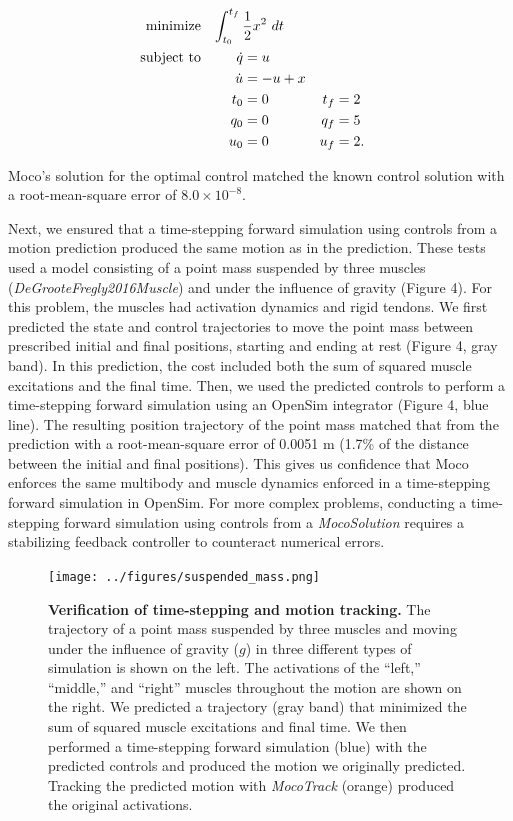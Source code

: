 \documentclass[10pt,letterpaper]{article}
\newcommand{\analytic}{
\begin{equation}
    \begin{aligned}
        \mbox{minimize} \quad
         \mathrlap{\int_{t_0}^{t_f} \frac{1}{2}x^2~dt}  \\
         \mbox{subject to} \quad
         && \dot{q} &= u \\
         && \dot{u} &= -u + x \\
         && t_0 &= 0 & t_f &= 2 \\
         && q_0 &= 0 & q_f &= 5 \\
         && u_0 &= 0 & u_f &= 2.
    \end{aligned}
\end{equation}
}
\begin{document}
\analytic

Moco's solution for the optimal control matched the known control solution with a root-mean-square error of $8.0 \times 10^{-8}$.

Next, we ensured that a time-stepping forward simulation using controls from a motion prediction produced the same motion as in the prediction. These tests used a model consisting of a point mass suspended by three muscles (\textit{DeGrooteFregly2016Muscle}) and under the influence of gravity (Figure 4). For this problem, the muscles had activation dynamics and rigid tendons. We first predicted the state and control trajectories to move the point mass between prescribed initial and final positions, starting and ending at rest (Figure 4, gray band). In this prediction, the cost included both the sum of squared muscle excitations and the final time. Then, we used the predicted controls to perform a time-stepping forward simulation using an OpenSim integrator (Figure 4, blue line). The resulting position trajectory of the point mass matched that from the prediction with a root-mean-square error of 0.0051 m (1.7\% of the distance between the initial and final positions). This gives us confidence that Moco enforces the same multibody and muscle dynamics enforced in a time-stepping forward simulation in OpenSim. For more complex problems, conducting a time-stepping forward simulation using controls from a \textit{MocoSolution} requires a stabilizing feedback controller to counteract numerical errors.

\begin{figure}[!h]
        \centering
        \texttt{[image: ../figures/suspended\_mass.png]}
        \caption{{\bf Verification of time-stepping and motion tracking.}
       The trajectory of a point mass suspended by three muscles and moving under the influence of gravity ($g$) in three different types of simulation is shown on the left. The activations of the “left,” “middle,” and “right” muscles throughout the motion are shown on the right. We predicted a trajectory (gray band) that minimized the sum of squared muscle excitations and final time. We then performed a time-stepping forward simulation (blue) with the predicted controls and produced the motion we originally predicted. Tracking the predicted motion with \textit{MocoTrack} (orange) produced the original activations.
        }
        \label{verification}
\end{figure}
\end{document}
